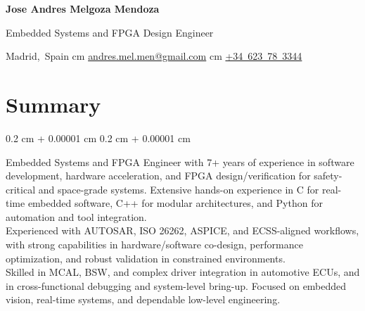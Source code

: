 \documentclass[10pt, letterpaper]{article}
\newenvironment{onecolentry}{
    \begin{adjustwidth}{
        0.2 cm + 0.00001 cm
    }{
        0.2 cm + 0.00001 cm
    }
}{
    \end{adjustwidth}
}
\newenvironment{header}{
    \setlength{\topsep}{0pt}\par\kern\topsep\centering\color{primaryColor}\linespread{1.5}
}{
    \par\kern\topsep
}
\let\hrefWithoutArrow\href
\renewcommand{\href}[2]{\hrefWithoutArrow{#1}{\ifthenelse{\equal{#2}{}}{ }{#2 }\raisebox{.15ex}{\footnotesize \faExternalLink*}}}
\begin{document}
\begin{header}
    \fontsize{30 pt}{30 pt}
    \textbf{Jose Andres Melgoza Mendoza}

    \vspace{0.2 cm}
    
    \fontsize{14 pt}{14 pt}
    Embedded Systems and FPGA Design Engineer


    \vspace{0.3 cm}

    \normalsize
    \mbox{{\footnotesize\faMapMarker*}\hspace*{0.13cm}Madrid, Spain}%
     cm%
    \mbox{\hrefWithoutArrow{mailto:andres.mel.men@gmail.com}{{\footnotesize\faEnvelope[regular]}\hspace*{0.13cm}andres.mel.men@gmail.com}}%
     cm%
    \mbox{\hrefWithoutArrow{tel:623783344}{{\footnotesize\faPhone*}\hspace*{0.13cm}+34 623 78 3344}}%
\end{header}

\vspace{0.3 cm}

\section{Summary}
\begin{onecolentry}
Embedded Systems and FPGA Engineer with 7+ years of experience in software development, hardware acceleration, and FPGA design/verification for safety-critical and space-grade systems. Extensive hands-on experience in C for real-time embedded software, C++ for modular architectures, and Python for automation and tool integration. \\
Experienced with AUTOSAR, ISO 26262, ASPICE, and ECSS-aligned workflows, with strong capabilities in hardware/software co-design, performance optimization, and robust validation in constrained environments. \\
Skilled in MCAL, BSW, and complex driver integration in automotive ECUs, and in cross-functional debugging and system-level bring-up. Focused on embedded vision, real-time systems, and dependable low-level engineering.
\end{onecolentry}
\end{document}
